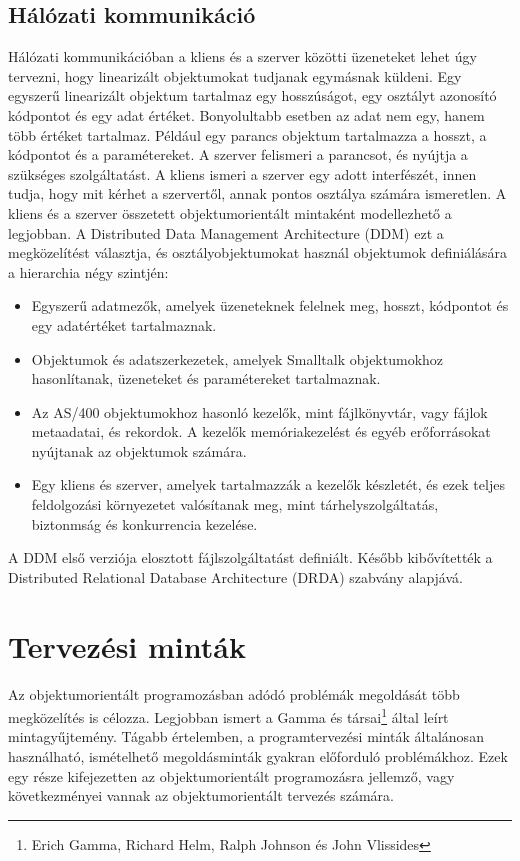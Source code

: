 \documentclass[]{thesis-ekf}
\theoremstyle{definition}
\begin{document}
	\section{Hálózati kommunikáció}
	
	Hálózati kommunikációban a kliens és a szerver közötti üzeneteket lehet úgy tervezni, hogy linearizált objektumokat tudjanak egymásnak küldeni. Egy egyszerű linearizált objektum tartalmaz egy hosszúságot, egy osztályt azonosító kódpontot és egy adat értéket. Bonyolultabb esetben az adat nem egy, hanem több értéket tartalmaz. Például egy parancs objektum tartalmazza a hosszt, a kódpontot és a paramétereket. A szerver felismeri a parancsot, és nyújtja a szükséges szolgáltatást. A kliens ismeri a szerver egy adott interfészét, innen tudja, hogy mit kérhet a szervertől, annak pontos osztálya számára ismeretlen. A kliens és a szerver összetett objektumorientált mintaként modellezhető a legjobban. A Distributed Data Management Architecture (DDM) ezt a megközelítést választja, és osztályobjektumokat használ objektumok definiálására a hierarchia négy szintjén:
	
	\begin{itemize}
		\item Egyszerű adatmezők, amelyek üzeneteknek felelnek meg, hosszt, kódpontot és egy adatértéket tartalmaznak.
		\item Objektumok és adatszerkezetek, amelyek Smalltalk objektumokhoz hasonlítanak, üzeneteket és paramétereket tartalmaznak.
		\item Az AS/400 objektumokhoz hasonló kezelők, mint fájlkönyvtár, vagy fájlok metaadatai, és rekordok. A kezelők memóriakezelést és egyéb erőforrásokat nyújtanak az objektumok számára.
		\item Egy kliens és szerver, amelyek tartalmazzák a kezelők készletét, és ezek teljes feldolgozási környezetet valósítanak meg, mint tárhelyszolgáltatás, biztonmság és konkurrencia kezelése.
	\end{itemize}
	
	A DDM első verziója elosztott fájlszolgáltatást definiált. Később kibővítették a Distributed Relational Database Architecture (DRDA) szabvány alapjává.
	
	\chapter{Tervezési minták}\label{fejezet-tmintak}
	
	Az objektumorientált programozásban adódó problémák megoldását több megközelítés is célozza. Legjobban ismert a Gamma és társai\footnote{Erich Gamma, Richard Helm, Ralph Johnson és John Vlissides} által leírt mintagyűjtemény. Tágabb értelemben, a programtervezési minták általánosan használható, ismételhető megoldásminták gyakran előforduló problémákhoz. Ezek egy része kifejezetten az objektumorientált programozásra jellemző, vagy következményei vannak az objektumorientált tervezés számára.
	
\end{document}
